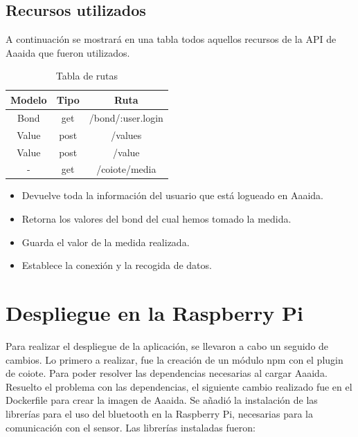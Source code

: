 \subsection{Recursos utilizados}

A continuación se mostrará en una tabla todos aquellos recursos de la API de Aaaida que fueron utilizados. 


\begin{table}[htb]

\begin{center}

\begin{tabular}{|c|c|c|}

\hline

{\bf Modelo} & {\bf Tipo} &

{\bf Ruta} \\ \hline \hline

Bond & get & /bond/:user.login  \\ \hline

Value & post & /values \\ \hline

Value & post & /value \\ \hline

- & get & /coiote/media \\ \hline

\end{tabular}

\caption{Tabla de rutas}

\label{T:prova}

\end{center}

\end{table}

\begin{itemize}
\item Devuelve toda la información del usuario que está logueado en Aaaida.
\item Retorna los valores del bond del cual hemos tomado la medida.
\item Guarda el valor de la medida realizada. 
\item Establece la conexión y la recogida de datos.
\end{itemize}

\section{Despliegue en la Raspberry Pi}

Para realizar el despliegue de la aplicación, se llevaron a cabo un seguido de cambios. 
Lo primero a realizar, fue la creación de un módulo npm con el plugin de coiote. Para poder resolver las dependencias necesarias al cargar Aaaida.
Resuelto el problema con las dependencias, el siguiente cambio realizado fue en el Dockerfile para crear la imagen de Aaaida. Se añadió la instalación de las librerías para el uso del bluetooth en la Raspberry Pi, necesarias para la comunicación con el sensor. 
Las librerías instaladas fueron:
 
